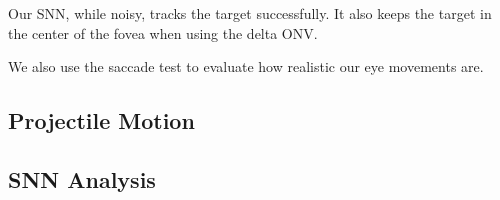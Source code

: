 \documentclass[../taasin.tex]{subfiles}
\begin{document}
Our SNN, while noisy, tracks the target successfully. It also keeps the target in the center of the fovea when using the delta ONV.

We also use the saccade test to evaluate how realistic our eye movements are.


\subsection{Projectile Motion}


\subsection{SNN Analysis}



\end{document}
